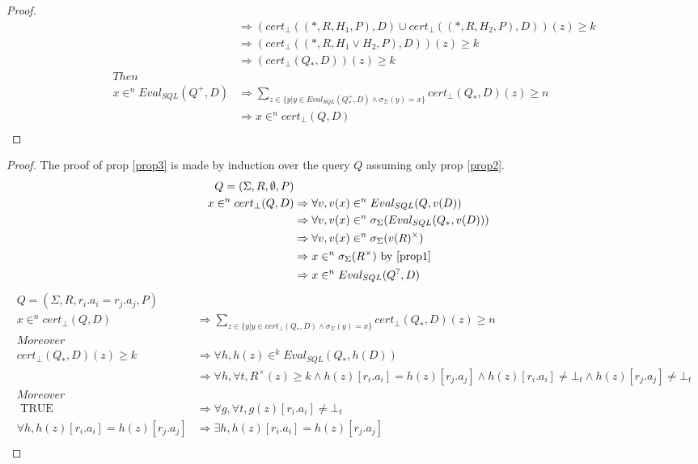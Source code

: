 \begin{proof}
\begin{align*}
		& \Rightarrow  (cert_\bot((*,R,H_1,P),D) \cup cert_\bot((*,R,H_2,P),D))(z)  \geq k \\
		& \Rightarrow  (cert_\bot((*,R,H_1 \lor H_2,P),D))(z)  \geq k \\
		& \Rightarrow  (cert_\bot(Q_*,D))(z)  \geq k \\
		Then \\
		x \in^n Eval_{SQL}(Q^+,D) & \Rightarrow \sum_{z \in \{y | y \in Eval_{SQL}(Q_*^+,D) \land \sigma_\Sigma(y) = x \} }{cert_\bot(Q_*,D)(z)} \geq n  \\
		& \Rightarrow x \in^n cert_\bot(Q,D) \\
	\end{align*}
\end{proof}

\begin{proof}
	The proof of prop \ref{prop3} is made by induction over the query $Q$ assuming only prop \ref{prop2}.
	\begin{align*}
		Q = (\Sigma,R,\emptyset,P) \\
		x \in^n cert_\bot(Q,D) & \Rightarrow \forall v, v(x) \in^n Eval_{SQL}(Q,v(D)) \\
		& \Rightarrow \forall v, v(x) \in^n \sigma_\Sigma(Eval_{SQL}(Q_*,v(D))) \\
		& \Rightarrow \forall v, v(x) \in^n \sigma_\Sigma(v(R)^\times) \\
		& \Rightarrow x \in^n \sigma_\Sigma(R^\times) \mbox{ by \ref{prop1}}\\
		& \Rightarrow x \in^n Eval_{SQL}(Q^?,D) \\
	\end{align*}
	\begin{align*}
		Q = (\Sigma,R,r_i.a_i = r_j.a_j,P) \\
		x \in^n cert_\bot(Q,D) & \Rightarrow \sum_{z \in \{y | y \in cert_\bot(Q_*,D) \land \sigma_\Sigma(y) = x \} }{cert_\bot(Q_*,D)(z)} \geq n \\
		Moreover\\
		cert_\bot(Q_*,D)(z)  \geq k & \Rightarrow  \forall h, h(z) \in^k Eval_{SQL}(Q_*,h(D)) \\
		& \Rightarrow  \forall h,\forall t, R^\times(z) \geq k \land h(z)[r_i.a_i] = h(z)[r_j.a_j] \land h(z)[r_i.a_i] \neq \bot_t \land h(z)[r_j.a_j] \neq \bot_t  \\
		Moreover \\
		\mbox{ TRUE} & \Rightarrow \forall g,\forall t, g(z)[r_i.a_i] \neq \bot_t \\
		\forall h, h(z)[r_i.a_i] = h(z)[r_j.a_j] & \Rightarrow \exists h, h(z)[r_i.a_i] = h(z)[r_j.a_j] \\

\end{align*}
\end{proof}
